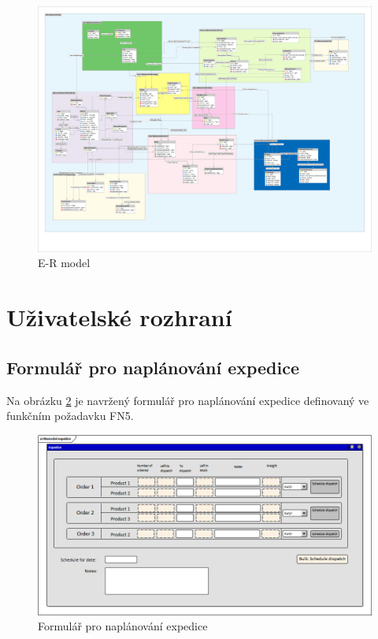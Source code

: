 \documentclass[thesis=B,czech]{FITthesis}[2012/06/26]
\begin{document}
\begin{figure}
	\includegraphics[width=500pt, height=\textwidth, angle=90]{mahasys_ermodel.png}
	\caption{E-R model}\label{er_model}
\end{figure}



\section{Uživatelské rozhraní}

\subsection{Formulář pro naplánování expedice}
	Na obrázku \ref{expedice} je navržený formulář pro naplánování expedice definovaný ve funkčním požadavku FN5.

\begin{figure}
	\includegraphics[width=\textwidth]{expedition_plan.png}
	\caption{Formulář pro naplánování expedice}\label{expedice}
\end{figure}
\end{document}
